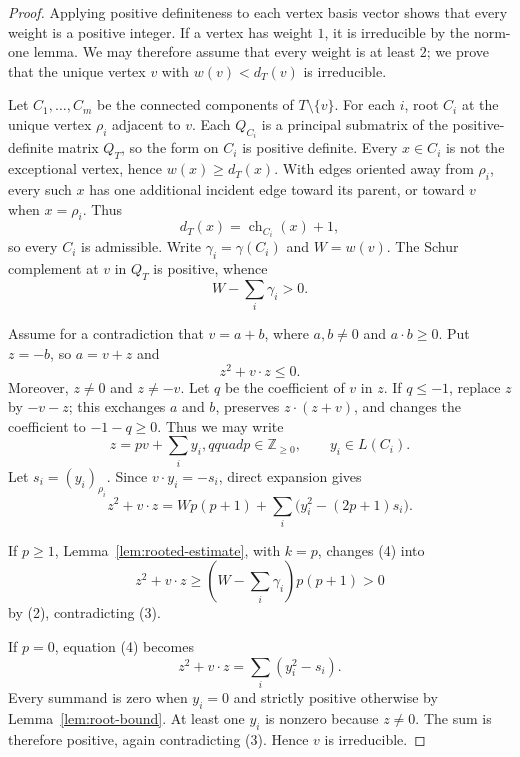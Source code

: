 \documentclass[11pt]{article}
\DeclareMathOperator{\ch}{ch}
\begin{document}
\begin{proof}
Applying positive definiteness to each vertex basis vector shows that every
weight is a positive integer.  If a vertex has weight $1$, it is irreducible
by the norm-one lemma.  We may therefore assume that every weight is at least
$2$; we prove that the unique vertex $v$ with $w(v)<d_T(v)$ is irreducible.

Let $C_1,\ldots,C_m$ be the connected components of $T\setminus\{v\}$.
For each $i$, root $C_i$ at the unique vertex $\rho_i$ adjacent to $v$.
Each $Q_{C_i}$ is a principal submatrix of the positive-definite matrix
$Q_T$, so the form on $C_i$ is positive definite.  Every $x\in C_i$ is not
the exceptional vertex, hence $w(x)\geq d_T(x)$.  With edges oriented away
from $\rho_i$, every such $x$ has one additional incident edge toward its
parent, or toward $v$ when $x=\rho_i$.  Thus
\[
 d_T(x)=\ch_{C_i}(x)+1,
\]
so every $C_i$ is admissible.  Write $\gamma_i=\gamma(C_i)$ and
$W=w(v)$.  The Schur complement at $v$ in $Q_T$ is positive, whence
\[
 W-\sum_i\gamma_i>0. \tag{2}
\]

Assume for a contradiction that $v=a+b$, where $a,b\neq0$ and
$a\mathbin{\cdot}b\geq0$.  Put $z=-b$, so $a=v+z$ and
\[
 z^2+v\mathbin{\cdot}z\leq0. \tag{3}
\]
Moreover, $z\neq0$ and $z\neq-v$.  Let $q$ be the coefficient of $v$ in
$z$.  If $q\leq-1$, replace $z$ by $-v-z$; this exchanges $a$ and $b$,
preserves $z\mathbin{\cdot}(z+v)$, and changes the coefficient to
$-1-q\geq0$.  Thus we may write
\[
 z=pv+\sum_i y_i,qquad p\in\mathbb Z_{\geq0},\qquad y_i\in L(C_i).
\]
Let $s_i=(y_i)_{\rho_i}$.  Since
$v\mathbin{\cdot}y_i=-s_i$, direct expansion gives
\[
 z^2+v\mathbin{\cdot}z
 =Wp(p+1)+\sum_i\bigl(y_i^2-(2p+1)s_i\bigr). \tag{4}
\]

If $p\geq1$, Lemma~\ref{lem:rooted-estimate}, with $k=p$, changes (4) into
\[
 z^2+v\mathbin{\cdot}z
 \geq\left(W-\sum_i\gamma_i\right)p(p+1)>0
\]
by (2), contradicting (3).

If $p=0$, equation (4) becomes
\[
 z^2+v\mathbin{\cdot}z=\sum_i(y_i^2-s_i).
\]
Every summand is zero when $y_i=0$ and strictly positive otherwise by
Lemma~\ref{lem:root-bound}.  At least one $y_i$ is nonzero because $z\neq0$.
The sum is therefore positive, again contradicting (3).  Hence $v$ is
irreducible.
\end{proof}
\end{document}
